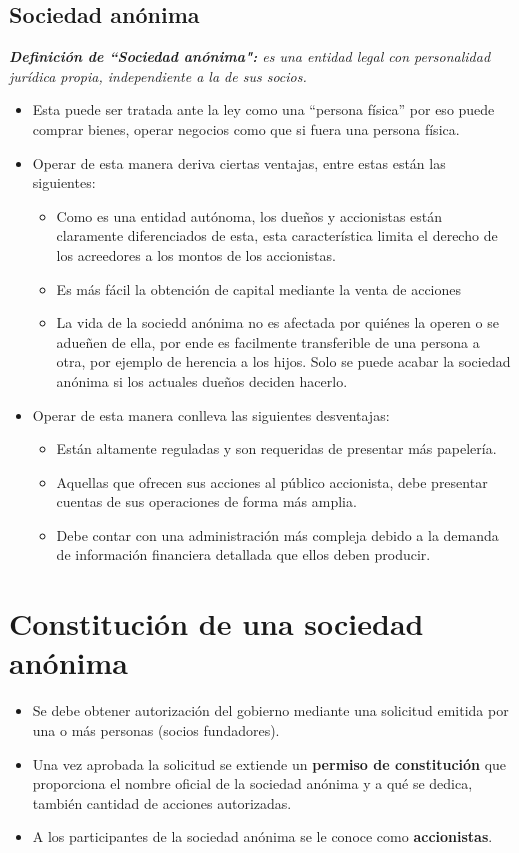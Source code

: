 \documentclass{article}
\begin{document}
\subsection{Sociedad anónima}
\emph{\textbf{Definición de ``Sociedad anónima":} es una entidad legal con personalidad jurídica propia, independiente a la de sus socios.}
\begin{itemize}
    \item Esta puede ser tratada ante la ley como una ``persona física'' por eso puede comprar bienes, operar negocios como que si fuera una persona física.
    \item Operar de esta manera deriva ciertas ventajas, entre estas están las siguientes:
    \begin{itemize}
        \item Como es una entidad autónoma, los dueños y accionistas están claramente diferenciados de esta, esta característica limita el derecho de los acreedores a los montos de los accionistas.
        \item Es más fácil la obtención de capital mediante la venta de acciones
        \item La vida de la sociedd anónima no es afectada por quiénes la operen o se adueñen de ella, por ende es facilmente transferible de una persona a otra, por ejemplo de herencia a los hijos. Solo se puede acabar la sociedad anónima si los actuales dueños deciden hacerlo.
    \end{itemize}
    
    \item Operar de esta manera conlleva las siguientes desventajas:
    \begin{itemize}
        \item Están altamente reguladas y son requeridas de presentar más papelería.
        \item Aquellas que ofrecen sus acciones al público accionista, debe presentar cuentas de sus operaciones de forma más amplia.
        \item Debe contar con una administración más compleja debido a la demanda de información financiera detallada que ellos deben producir.
    \end{itemize}
\end{itemize}

\section{Constitución de una sociedad anónima}
\begin{itemize}
    \item Se debe obtener autorización del gobierno mediante una solicitud emitida por una o más personas (socios fundadores).
    \item Una vez aprobada la solicitud se extiende un \textbf{permiso de constitución} que proporciona el nombre oficial de la sociedad anónima y a qué se dedica, también cantidad de acciones autorizadas.
    \item A los participantes de la sociedad anónima se le conoce como \textbf{accionistas}.
\end{itemize}
\end{document}
